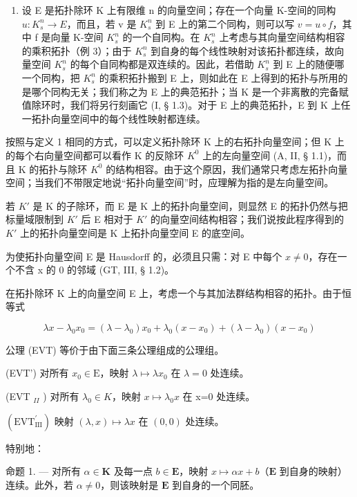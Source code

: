 \begin{enumerate}
\def\labelenumi{\arabic{enumi})}
\setcounter{enumi}{4}
\tightlist
\item
  设 E 是拓扑除环 K 上有限维 n 的向量空间；存在一个向量 K-空间的同构 \(u:K_{s}^{n}\to E\)，而且，若 v 是 \(K_{s}^{n}\) 到 E 上的第二个同构，则可以写 \(v=u\circ f\)，其中 f 是向量 K-空间 \(K_{s}^{n}\) 的一个自同构。在 \(K_{s}^{n}\) 上考虑与其向量空间结构相容的乘积拓扑（例 3）；由于 \(K_{s}^{n}\) 到自身的每个线性映射对该拓扑都连续，故向量空间 \(K_{s}^{n}\) 的每个自同构都是双连续的。因此，若借助 \(K_{s}^{n}\) 到 E 上的随便哪一个同构，把 \(K_{s}^{n}\) 的乘积拓扑搬到 E 上，则如此在 E 上得到的拓扑与所用的是哪个同构无关；我们称之为 E 上的典范拓扑；当 K 是一个非离散的完备赋值除环时，我们将另行刻画它 (I, § 1.3)。对于 E 上的典范拓扑，E 到 K 上任一拓扑向量空间中的每个线性映射都连续。
\end{enumerate}

按照与定义 1 相同的方式，可以定义拓扑除环 K 上的右拓扑向量空间；但 K 上的每个右向量空间都可以看作 K 的反除环 \(K^{0}\) 上的左向量空间 (A, II, § 1.1)，而且 K 的拓扑与除环 \(K^{0}\) 的结构相容。由于这个原因，我们通常只考虑左拓扑向量空间；当我们不带限定地说“拓扑向量空间”时，应理解为指的是左向量空间。

若 \(K'\) 是 K 的子除环，而 E 是 K 上的拓扑向量空间，则显然 E 的拓扑仍然与把标量域限制到 \(K'\) 后 E 相对于 \(K'\) 的向量空间结构相容；我们说按此程序得到的 \(K'\) 上的拓扑向量空间是 K 上拓扑向量空间 E 的底空间。

为使拓扑向量空间 E 是 Hausdorff 的，必须且只需：对 E 中每个 \(x \neq 0\)，存在一个不含 x 的 0 的邻域 (GT, III, § 1.2)。

在拓扑除环 K 上的向量空间 E 上，考虑一个与其加法群结构相容的拓扑。由于恒等式

\[
\lambda x - \lambda_ {0} x _ {0} = (\lambda - \lambda_ {0}) x _ {0} + \lambda_ {0} (x - x _ {0}) + (\lambda - \lambda_ {0}) (x - x _ {0})
\]

公理 (EVT) 等价于由下面三条公理组成的公理组。

(EVT') 对所有 \(x_0 \in \mathrm{E}\)，映射 \(\lambda \mapsto \lambda x_0\) 在 \(\lambda = 0\) 处连续。

(EVT \(_{II}\) ) 对所有 \(\lambda_{0}\in K\)，映射 \(x\mapsto\lambda_{0}x\) 在 x=0 处连续。

\((\mathrm{EVT}_{\mathrm{III}}^{\prime})\) 映射 \((\lambda, x) \mapsto \lambda x\) 在 \((0, 0)\) 处连续。

特别地：

命题 1. --- 对所有 \(\alpha \in \mathbf{K}\) 及每一点 \(b \in \mathbf{E}\)，映射 \(x \mapsto \alpha x + b\)（\(\mathbf{E}\) 到自身的映射）连续。此外，若 \(\alpha \neq 0\)，则该映射是 \(\mathbf{E}\) 到自身的一个同胚。


